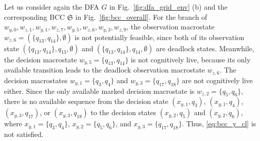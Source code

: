\documentclass[final,5p,times,twocolumn,authoryear]{elsarticle}
\begin{document}
%
\begin{example}\label{ex:y_z_prop}
Let us consider again the DFA $G$ in Fig.~\ref{fig:dfa_grid_env} (b) and the corresponding BCC $\mathfrak{S}$ in Fig.~\ref{fig:bcc_overall}.
%
For the branch of $w_{y,0}, w_{z,1}, w_{y,1}, w_{z,7}, w_{y,5}, w_{z,6}, w_{y,3}, w_{z,9}$, the observation macrostate $w_{z,6} = (\{ q_{13}, q_{14} \}, \emptyset)$ is not potentially feasible, since both of its observation state $(\{ q_{13}, q_{14} \}, q_{13}, \emptyset)$ and $(\{ q_{13}, q_{14} \}, q_{14}, \emptyset)$ are deadlock states.
%
Meanwhile, the decision macrostate $w_{y,5} = \{ q_{13}, q_{14} \}$ is not cognitively live, because its only available transition leads to the deadlock observation macrostate $w_{z,6}$.
The decision macrostates $w_{y,1} = \{ q_{3}, q_{4} \}$ and $w_{y,3} = \{ q_{17}, q_{18} \}$ are not cognitively live either.
Since the only available marked decision macrostate is $w_{z,2} = \{ q_5, q_6 \}$, there is no available sequence from the decision state  $(x_{y,1}, q_3)$, $(x_{y,1}, q_4)$, $(x_{y,3}, q_{17})$, or $(x_{y,3}, q_{18})$ to the decision states $(x_{y,2}, q_5)$ and $(x_{y,2}, q_6)$, where $x_{y,1} = \{ q_3, q_4 \}$, $x_{y,2} = \{ q_5, q_6 \}$, and $x_{y,3} = \{ q_{17}, q_{18} \}$. 
Thus, \eqref{eq:bcc_y_cl} is not satisfied.



\end{example}
\end{document}
